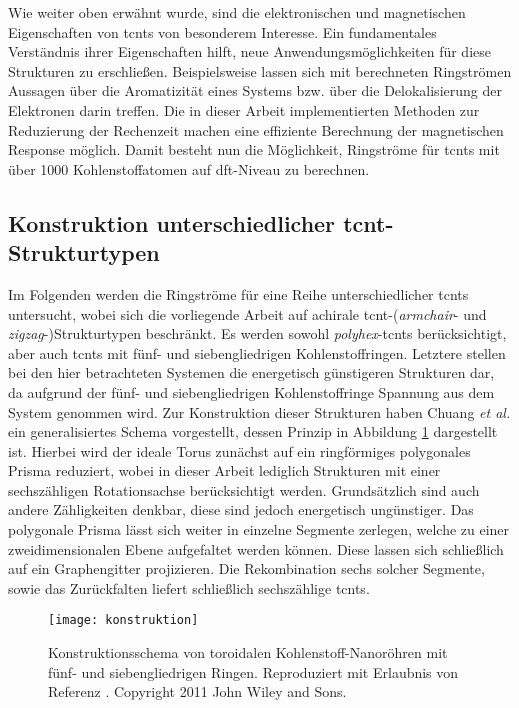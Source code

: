 Wie weiter oben erwähnt wurde, sind die elektronischen und magnetischen Eigenschaften von \acp{tcnt} von besonderem Interesse. Ein fundamentales Verständnis ihrer Eigenschaften hilft, neue Anwendungsmöglichkeiten für diese Strukturen zu erschließen. Beispielsweise lassen sich mit berechneten Ringströmen Aussagen über die Aromatizität eines Systems bzw. über die Delokalisierung der Elektronen darin treffen. Die in dieser Arbeit implementierten Methoden zur Reduzierung der Rechenzeit machen eine effiziente Berechnung der magnetischen Response möglich. Damit besteht nun die Möglichkeit, Ringströme für \acp{tcnt} mit über 1000 Kohlenstoffatomen auf \ac{dft}-Niveau zu berechnen.

\subsection{Konstruktion unterschiedlicher \acs{tcnt}-Strukturtypen}
Im Folgenden werden die Ringströme für eine Reihe unterschiedlicher \acp{tcnt} untersucht, wobei sich die vorliegende Arbeit auf achirale \ac{tcnt}-(\textit{armchair}- und \textit{zigzag}-)Strukturtypen beschränkt. Es werden sowohl \textit{polyhex}-\acp{tcnt} berücksichtigt, aber auch \acp{tcnt} mit fünf- und siebengliedrigen Kohlenstoffringen. Letztere stellen bei den hier betrachteten Systemen die energetisch günstigeren Strukturen dar, da aufgrund der fünf- und siebengliedrigen Kohlenstoffringe Spannung aus dem System genommen wird. Zur Konstruktion dieser Strukturen haben Chuang \textit{et al.}\supercite{chuang2009generalized,chuang2009dual,beuerle2011optical} ein generalisiertes Schema vorgestellt, dessen Prinzip in Abbildung \ref{abb:tcntkonstruktion} dargestellt ist. Hierbei wird der ideale Torus zunächst auf ein ringförmiges polygonales Prisma reduziert, wobei in dieser Arbeit lediglich Strukturen mit einer sechszähligen Rotationsachse berücksichtigt werden. Grundsätzlich sind auch andere Zähligkeiten denkbar, diese sind jedoch energetisch ungünstiger. Das polygonale Prisma lässt sich weiter in einzelne Segmente zerlegen, welche zu einer zweidimensionalen Ebene aufgefaltet werden können. Diese lassen sich schließlich auf ein Graphengitter projizieren. Die Rekombination sechs solcher Segmente, sowie das Zurückfalten liefert schließlich sechszählige \acp{tcnt}. 
\FloatBarrier
\begin{figure}[ht!]
	\centering
	\texttt{[image: konstruktion]}
	\captionsetup{figurewithin = chapter}
	\captionsetup{font=small, labelfont=bf}\caption[Konstruktionsschema von toroidalen Kohlenstoff-Nanoröhren mit fünf- und siebengliedrigen Ringen]{Konstruktionsschema von toroidalen Kohlenstoff-Nanoröhren mit fünf- und siebengliedrigen Ringen. Reproduziert mit Erlaubnis von Referenz \cite{beuerle2011optical}. Copyright 2011 John Wiley and Sons.}
\label{abb:tcntkonstruktion}
\end{figure}
